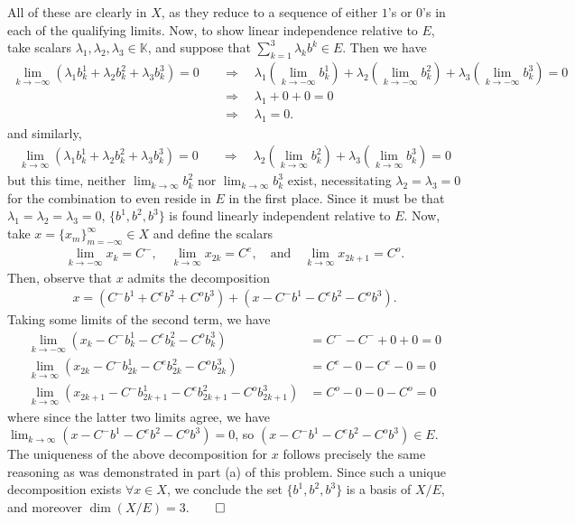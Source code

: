 \documentclass[10pt]{article}
\newcommand{\mbb}[1]{\mathbb{#1}}
\newcommand{\1}[1]{\mathbbm{1}_{#1}}
\begin{document}
    All of these are clearly in $X$, as they reduce to a sequence of either $1$'s or $0$'s in each of the qualifying limits. Now, to show linear independence relative to $E$, take scalars $\lambda_1,\lambda_2,\lambda_3\in\mbb{K}$, and suppose that $\sum_{k=1}^3\lambda_kb^k\in E$. Then we have
    \begin{align*}
        \lim_{k\rightarrow-\infty}(\lambda_1b^1_k+\lambda_2b^2_k+\lambda_3b^3_k)=0\quad&\Rightarrow\quad\lambda_1(\lim_{k\rightarrow-\infty}b^1_k)+\lambda_2(\lim_{k\rightarrow -\infty}b^2_k)+\lambda_3(\lim_{k\rightarrow -\infty}b^3_k)=0\\
        &\Rightarrow\quad\lambda_1+0+0=0\\
        &\Rightarrow\quad\lambda_1=0.
    \end{align*}
    and similarly,
    \begin{align*}
        \lim_{k\rightarrow\infty}(\lambda_1b^1_k+\lambda_2b^2_k+\lambda_3b^3_k)=0\quad&\Rightarrow\quad\lambda_2(\lim_{k\rightarrow \infty}b^2_k)+\lambda_3(\lim_{k\rightarrow \infty}b^3_k)=0
    \end{align*}
    but this time, neither $\lim_{k\rightarrow\infty}b^2_k$ nor $\lim_{k\rightarrow\infty}b^3_k$ exist, necessitating $\lambda_2=\lambda_3=0$ for the combination to even reside in $E$ in the first place.
    Since it must be that $\lambda_1=\lambda_2=\lambda_3=0$, $\{b^1,b^2,b^3\}$ is found linearly independent relative to $E$. Now, take $x=\{x_m\}_{m=-\infty}^\infty\in X$ and define the scalars
    \begin{align*}
        \lim_{k\rightarrow-\infty}x_k=C^-,\quad\lim_{k\rightarrow\infty}x_{2k}=C^e,\quad\text{and}\quad\lim_{k\rightarrow\infty}x_{2k+1}=C^o.
    \end{align*}
    Then, observe that $x$ admits the decomposition
    \begin{align*}
        x=(C^-b^1+C^eb^2+C^ob^3)+(x-C^-b^1-C^eb^2-C^ob^3).
    \end{align*}
    Taking some limits of the second term, we have
    \begin{align*}
        \lim_{k\rightarrow-\infty}(x_k-C^-b^1_k-C^eb^2_k-C^ob^3_k)&=C^--C^-+0+0=0\\
        \lim_{k\rightarrow\infty}(x_{2k}-C^-b^1_{2k}-C^eb^2_{2k}-C^ob^3_{2k})&=C^e-0-C^e-0=0\\
        \lim_{k\rightarrow\infty}(x_{2k+1}-C^-b^1_{2k+1}-C^eb^2_{2k+1}-C^ob^3_{2k+1})&=C^o-0-0-C^o=0
    \end{align*}
    where since the latter two limits agree, we have $\lim_{k\rightarrow\infty}(x-C^-b^1-C^eb^2-C^ob^3)=0$, so $(x-C^-b^1-C^eb^2-C^ob^3)\in E$. 
    The uniqueness of the above decomposition for $x$ follows precisely the same reasoning as was demonstrated in part (a) of this problem.
    Since such a unique decomposition exists $\forall x\in X$, we conclude the set $\{b^1,b^2,b^3\}$ is a basis of $X/E$, and moreover $\dim(X/E)=3$.\hfill{$\qed$}
\end{document}
